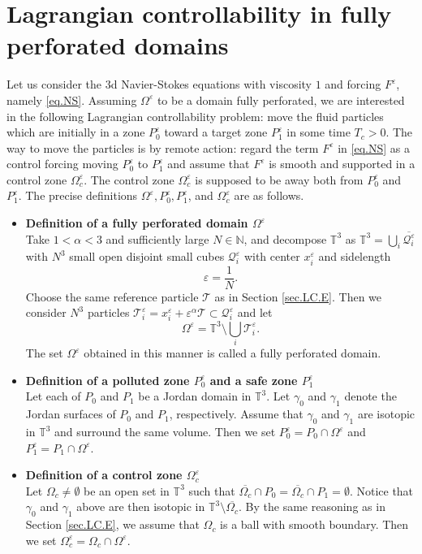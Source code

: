\documentclass[11pt,a4paper]{article}
\numberwithin{equation}{section}
\newcommand{\N}{\mathbb{N}}
\newcommand{\T}{\mathbb{T}}
\newcommand{\eps}{\varepsilon}
\begin{document}
    \section{Lagrangian controllability in fully perforated domains}
    \label{sec.LC.D}


Let us consider the 3d Navier-Stokes equations with viscosity $1$ and forcing $F^\eps$, namely \eqref{eq.NS}. Assuming $\Omega^\eps$ to be a domain fully perforated, we are interested in the following Lagrangian controllability problem: move the fluid particles which are initially in a zone $P_0^\eps$ toward a target zone $P_1^\eps$ in some time $T_c>0$. The way to move the particles is by remote action: regard the term $F^\eps$ in \eqref{eq.NS} as a control forcing moving $P_0^\eps$ to $P_1^\eps$ and assume that $F^\eps$ is smooth and supported in a control zone $\Omega_c^\eps$. The control zone $\Omega_c^\eps$ is supposed to be away both from $P_0^{\eps}$ and $P_1^\eps$. The precise definitions $\Omega^\eps, P_0^\eps, P_1^\eps$, and $\Omega_c^\eps$ are as follows. 


\begin{itemize}
\item
\textbf{Definition of a fully perforated domain $\Omega^\eps$} \\
Take $1 < \alpha < 3$ and sufficiently large $N\in\N$, and decompose $\T^3$ as  
$\T^3 = \bigcup_i \overline{\mathcal{Q}^\eps_i}$ with $N^3$ small open disjoint small cubes $\mathcal{Q}^\eps_i$ with center $x^\eps_i$ and sidelength 
\begin{equation}\label{def.eps'}
    \eps = \frac{1}{N}. 
\end{equation}
Choose the same reference particle $\mathcal{T}$ as in Section \ref{sec.LC.E}. Then we consider $N^3$ particles $\mathcal{T}^\eps_i = x^\eps_i + \eps^\alpha \mathcal{T} \subset \mathcal{Q}^\eps_i$ and let 
\[
    \Omega^\eps = \T^3 \setminus \bigcup_i \mathcal{T}^\eps_i. 
\]
The set $\Omega^\eps$ obtained in this manner is called a fully perforated domain. 


\item
\textbf{Definition of a polluted zone $P_0^\eps$ and a safe zone $P_1^\eps$} \\
Let each of $P_0$ and $P_1$ be a Jordan domain in $\T^3$. Let $\gamma_0$ and $\gamma_1$ denote the Jordan surfaces of $P_0$ and $P_1$, respectively. Assume that $\gamma_0$ and $\gamma_1$ are isotopic in $\T^3$ and surround the same volume. Then we set $P_0^\eps = P_0\cap \Omega^\eps$ and $P_1^\eps = P_1\cap \Omega^\eps$. 


\item
\textbf{Definition of a control zone $\Omega_c^\eps$} \\
Let $\Omega_c\neq \emptyset$ be an open set in $\T^3$ such that $\overline{\Omega_{c}} \cap P_0 = \overline{\Omega_{c}} \cap P_1 = \emptyset$.  Notice that $\gamma_0$ and $\gamma_1$ above are then isotopic in $\T^3\setminus\overline{\Omega_{c}}$. By the same reasoning as in Section \ref{sec.LC.E}, we assume that $\Omega_c$ is a ball with smooth boundary. Then we set $\Omega_c^\eps = \Omega_c\cap \Omega^\eps$. 
\end{itemize}
\end{document}
